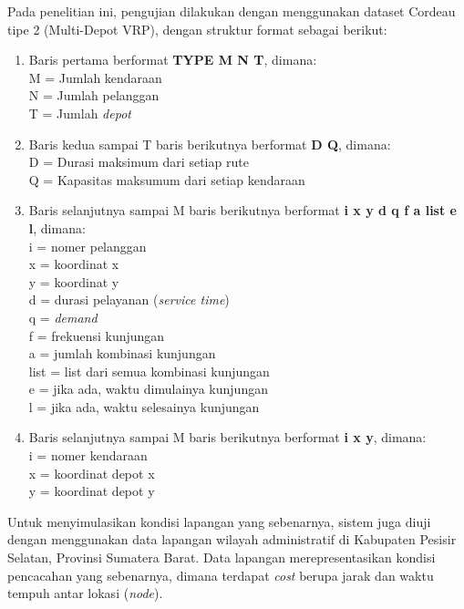 Pada penelitian ini, pengujian dilakukan dengan menggunakan dataset Cordeau tipe 2 (Multi-Depot VRP), dengan struktur format sebagai berikut:
\begin{enumerate}
	\item Baris pertama berformat \textbf{TYPE M N T}, dimana: \\
	M = Jumlah kendaraan \\
	N = Jumlah pelanggan \\
	T = Jumlah \textit{depot}
	
	\item Baris kedua sampai T baris berikutnya berformat \textbf{D Q}, dimana: \\
	D = Durasi maksimum dari setiap rute \\
	Q = Kapasitas maksumum dari setiap kendaraan
	
	\item Baris selanjutnya sampai M baris berikutnya berformat \textbf{i x y d q f a list e l}, dimana: \\
	i	= nomer pelanggan \\
	x	= koordinat x \\
	y	= koordinat y \\
	d	= durasi pelayanan (\textit{service time}) \\
	q	= \textit{demand} \\
	f	= frekuensi kunjungan \\
	a	= jumlah kombinasi kunjungan \\
	list	= list dari semua kombinasi kunjungan \\
	e	= jika ada, waktu dimulainya kunjungan \\
	l	= jika ada, waktu selesainya kunjungan
	
	\item Baris selanjutnya sampai M baris berikutnya berformat \textbf{i x y}, dimana: \\
	i	= nomer kendaraan \\
	x	= koordinat depot x \\
	y	= koordinat depot y \\
\end{enumerate}

Untuk menyimulasikan kondisi lapangan yang sebenarnya, sistem juga diuji dengan menggunakan data lapangan wilayah administratif di Kabupaten Pesisir Selatan, Provinsi Sumatera Barat. Data lapangan merepresentasikan kondisi pencacahan yang sebenarnya, dimana terdapat \textit{cost} berupa jarak dan waktu tempuh antar lokasi (\textit{node}). 

